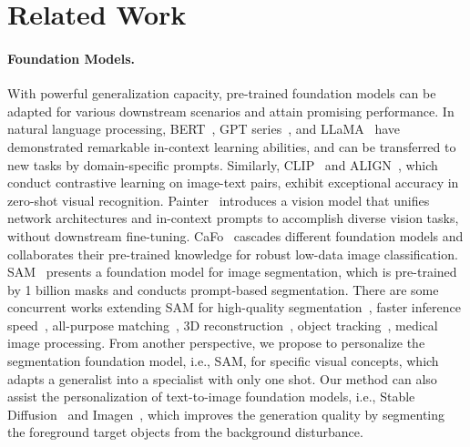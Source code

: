 \documentclass{article} \usepackage{iclr2024_conference,times}
\begin{document}
\section{Related Work}
\label{related}

\paragraph{Foundation Models.} 
With powerful generalization capacity, pre-trained foundation models can be adapted for various downstream scenarios and attain promising performance. In natural language processing, BERT~\citep{devlin2018bert,lu2019vilbert}, GPT series~\citep{brown2020language,OpenAI2023GPT4TR,Radford2018ImprovingLU,radford2019language}, and LLaMA~\citep{zhang2023llama} have demonstrated remarkable in-context learning abilities, and can be transferred to new tasks by domain-specific prompts. Similarly, CLIP~\citep{radford2021learning} and ALIGN~\citep{jia2021scaling}, which conduct contrastive learning on image-text pairs, exhibit exceptional accuracy in zero-shot visual recognition.
Painter~\citep{wang2022images} introduces a vision model that unifies network architectures and in-context prompts to accomplish diverse vision tasks, without downstream fine-tuning.
CaFo~\citep{zhang2023prompt} cascades different foundation models and collaborates their pre-trained knowledge for robust low-data image classification.
SAM~\citep{kirillov2023segment} presents a foundation model for image segmentation, which is pre-trained by 1 billion masks and conducts prompt-based segmentation. 
There are some concurrent works extending SAM for high-quality segmentation~\citep{ke2023segment}, faster inference speed~\citep{zhao2023fast,zhang2023faster}, all-purpose matching~\citep{liu2023matcher}, 3D reconstruction~\citep{cen2023segment}, object tracking~\citep{yang2023track}, medical~\citep{ma2023segment,huang2023segment} image processing.
From another perspective, we propose to personalize the segmentation foundation model, i.e., SAM, for specific visual concepts, which adapts a generalist into a specialist with only one shot.
Our method can also assist the personalization of text-to-image foundation models, i.e., Stable Diffusion~\citep{rombach2022high} and Imagen~\citep{saharia2022photorealistic}, which improves the generation quality by segmenting the foreground target objects from the background disturbance.
\end{document}
